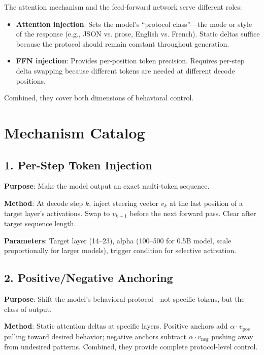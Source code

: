 \documentclass[11pt,a4paper]{article}
\begin{document}
The attention mechanism and the feed-forward network serve different roles:

\begin{itemize}
\item \textbf{Attention injection}: Sets the model's ``protocol class''---the mode or style of the response (e.g., JSON vs. prose, English vs. French). Static deltas suffice because the protocol should remain constant throughout generation.
\item \textbf{FFN injection}: Provides per-position token precision. Requires per-step delta swapping because different tokens are needed at different decode positions.
\end{itemize}

Combined, they cover both dimensions of behavioral control.

\section{Mechanism Catalog}

\subsection{1. Per-Step Token Injection}

\textbf{Purpose}: Make the model output an exact multi-token sequence.

\textbf{Method}: At decode step $k$, inject steering vector $v_k$ at the last position of a target layer's activations. Swap to $v_{k+1}$ before the next forward pass. Clear after target sequence length.

\textbf{Parameters}: Target layer (14--23), alpha (100--500 for 0.5B model, scale proportionally for larger models), trigger condition for selective activation.

\subsection{2. Positive/Negative Anchoring}

\textbf{Purpose}: Shift the model's behavioral protocol---not specific tokens, but the class of output.

\textbf{Method}: Static attention deltas at specific layers. Positive anchors add $\alpha \cdot v_{\text{pos}}$ pulling toward desired behavior; negative anchors subtract $\alpha \cdot v_{\text{neg}}$ pushing away from undesired patterns. Combined, they provide complete protocol-level control.
\end{document}
